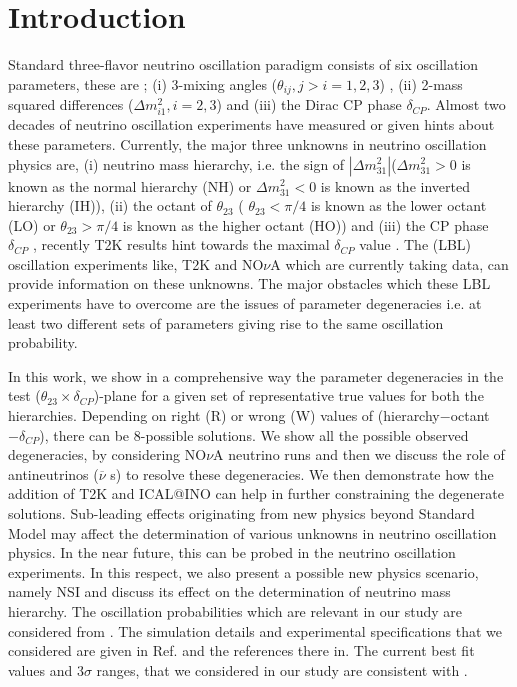 \documentclass{svproc}
\begin{document}
\section{Introduction}
%
Standard three-flavor neutrino oscillation paradigm consists of six oscillation parameters, these are ; (i) 3-mixing angles ($\theta_{ij}, j>i=1,2,3$)
, (ii) 2-mass squared differences ($\Delta m^2_{i1}, i=2,3$)  and (iii) the Dirac CP phase $\delta_{CP}$. Almost two decades of neutrino oscillation experiments have measured or given  hints about these parameters. 
Currently, the major three unknowns  in neutrino oscillation physics are, (i) neutrino mass hierarchy, i.e. the sign of $|\Delta m^2_{31}|$($\Delta m^2_{31} > 0$ is known as the normal hierarchy (NH) or $\Delta m^2_{31} < 0$ is  known as the inverted hierarchy (IH)),  (ii) the octant of $\theta_{23}$ ( $\theta_{23} < \pi/4$ is known as the lower octant (LO) or $\theta_{23} > \pi/4$ is  known as the higher octant (HO)) and (iii) the CP phase $\delta_{CP}$ , recently T2K results  hint towards the maximal $\delta_{CP}$ value \cite{Abe:2013hdq}.  
The  (LBL) oscillation experiments like, T2K  \cite{Abe:2015awa}  and NO$ \nu $A \cite{Adamson:2016tbq} which are currently taking data, can provide information on these unknowns. The major obstacles which these LBL experiments have to overcome are the issues of parameter degeneracies i.e. at least two different sets of parameters giving rise to the same oscillation probability. 

In this work, we show in a comprehensive way the parameter degeneracies in the test ($ \theta_{23}\times\delta_{CP} $)-plane for a given set of representative true values for both the hierarchies. Depending on right (R) or wrong (W) values of (hierarchy$-$octant$-\delta_{CP} $), there can be 8-possible solutions.  We show all the possible observed degeneracies, by considering NO$ \nu $A neutrino runs and then we discuss the role of antineutrinos ($ \overline{\nu} $ s) to resolve these degeneracies. We then demonstrate how the addition of T2K and ICAL@INO can help in further  constraining the degenerate solutions.
Sub-leading effects originating from new physics beyond Standard Model may affect the determination of various unknowns in neutrino oscillation physics. In the near future, this can be probed in the  neutrino oscillation experiments. In this respect, we also present a possible  new physics scenario, namely NSI and discuss its effect on the determination of neutrino mass hierarchy. The oscillation probabilities which are relevant in our study are considered from \cite{Akhmedov:2004ny}. The simulation details and experimental specifications that we considered are given in Ref. \cite{Ghosh:2015ena,Deepthi:2016erc} and the references there in.  The current best fit values and $3\sigma$ ranges,  that we considered in our study  are consistent with  \cite{Gonzalez-Garcia:2014bfa,global_valle}. 
\vspace{-4mm}
\end{document}
